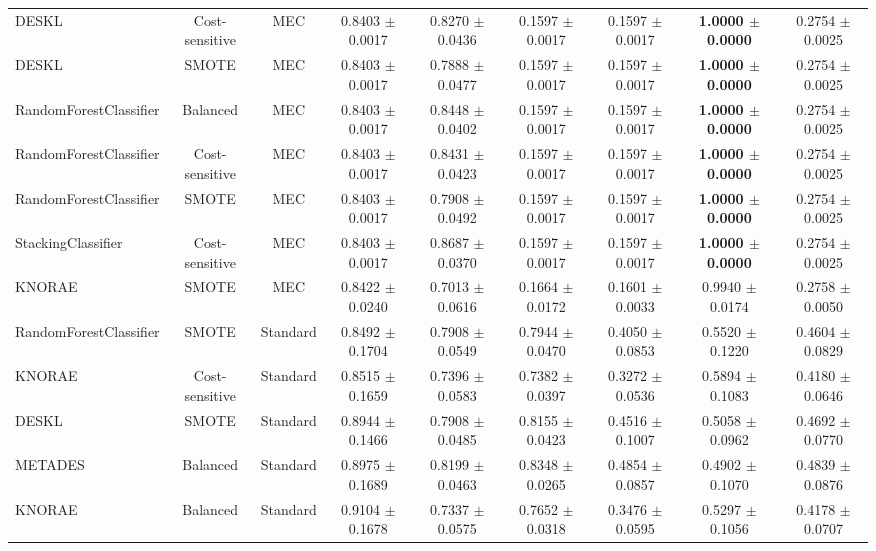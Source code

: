 \documentclass[conference]{IEEEtran}
\begin{document}
\begin{table}[h]
\begin{threeparttable}
{\begin{tabular}{lcc|cccccc}
            DESKL & Cost-sensitive & MEC & 0.8403 $\pm$ 0.0017 & 0.8270 $\pm$ 0.0436 & 0.1597 $\pm$ 0.0017 & 0.1597 $\pm$ 0.0017 & \textbf{1.0000 $\pm$ 0.0000} & 0.2754 $\pm$ 0.0025 \\
            DESKL & SMOTE & MEC & 0.8403 $\pm$ 0.0017 & 0.7888 $\pm$ 0.0477 & 0.1597 $\pm$ 0.0017 & 0.1597 $\pm$ 0.0017 & \textbf{1.0000 $\pm$ 0.0000} & 0.2754 $\pm$ 0.0025 \\
            RandomForestClassifier & Balanced & MEC & 0.8403 $\pm$ 0.0017 & 0.8448 $\pm$ 0.0402 & 0.1597 $\pm$ 0.0017 & 0.1597 $\pm$ 0.0017 & \textbf{1.0000 $\pm$ 0.0000} & 0.2754 $\pm$ 0.0025 \\
            RandomForestClassifier & Cost-sensitive & MEC & 0.8403 $\pm$ 0.0017 & 0.8431 $\pm$ 0.0423 & 0.1597 $\pm$ 0.0017 & 0.1597 $\pm$ 0.0017 & \textbf{1.0000 $\pm$ 0.0000} & 0.2754 $\pm$ 0.0025 \\
            RandomForestClassifier & SMOTE & MEC & 0.8403 $\pm$ 0.0017 & 0.7908 $\pm$ 0.0492 & 0.1597 $\pm$ 0.0017 & 0.1597 $\pm$ 0.0017 & \textbf{1.0000 $\pm$ 0.0000} & 0.2754 $\pm$ 0.0025 \\
            StackingClassifier & Cost-sensitive & MEC & 0.8403 $\pm$ 0.0017 & 0.8687 $\pm$ 0.0370 & 0.1597 $\pm$ 0.0017 & 0.1597 $\pm$ 0.0017 & \textbf{1.0000 $\pm$ 0.0000} & 0.2754 $\pm$ 0.0025 \\
            KNORAE & SMOTE & MEC & 0.8422 $\pm$ 0.0240 & 0.7013 $\pm$ 0.0616 & 0.1664 $\pm$ 0.0172 & 0.1601 $\pm$ 0.0033 & 0.9940 $\pm$ 0.0174 & 0.2758 $\pm$ 0.0050 \\
            RandomForestClassifier & SMOTE & Standard & 0.8492 $\pm$ 0.1704 & 0.7908 $\pm$ 0.0549 & 0.7944 $\pm$ 0.0470 & 0.4050 $\pm$ 0.0853 & 0.5520 $\pm$ 0.1220 & 0.4604 $\pm$ 0.0829 \\
            KNORAE & Cost-sensitive & Standard & 0.8515 $\pm$ 0.1659 & 0.7396 $\pm$ 0.0583 & 0.7382 $\pm$ 0.0397 & 0.3272 $\pm$ 0.0536 & 0.5894 $\pm$ 0.1083 & 0.4180 $\pm$ 0.0646 \\
            DESKL & SMOTE & Standard & 0.8944 $\pm$ 0.1466 & 0.7908 $\pm$ 0.0485 & 0.8155 $\pm$ 0.0423 & 0.4516 $\pm$ 0.1007 & 0.5058 $\pm$ 0.0962 & 0.4692 $\pm$ 0.0770 \\
            METADES & Balanced & Standard & 0.8975 $\pm$ 0.1689 & 0.8199 $\pm$ 0.0463 & 0.8348 $\pm$ 0.0265 & 0.4854 $\pm$ 0.0857 & 0.4902 $\pm$ 0.1070 & 0.4839 $\pm$ 0.0876 \\
            KNORAE & Balanced & Standard & 0.9104 $\pm$ 0.1678 & 0.7337 $\pm$ 0.0575 & 0.7652 $\pm$ 0.0318 & 0.3476 $\pm$ 0.0595 & 0.5297 $\pm$ 0.1056 & 0.4178 $\pm$ 0.0707 \\

\end{tabular}}
\end{threeparttable}
\end{table}
\end{document}
